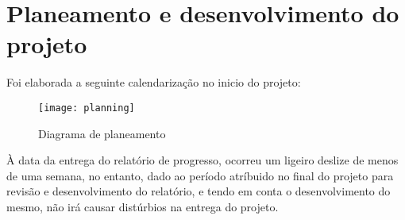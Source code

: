 \section{Planeamento e desenvolvimento do projeto} 
Foi elaborada a seguinte calendarização no inicio do projeto:

\begin{figure}[h]
	\centering
	\texttt{[image: planning]}
	\caption{Diagrama de planeamento}
\end{figure}

À data da entrega do relatório de progresso, ocorreu um ligeiro deslize de menos de uma semana, no entanto, dado ao período atríbuido no final do projeto para revisão e desenvolvimento do relatório, e tendo em conta o desenvolvimento do mesmo, não irá causar distúrbios na entrega do projeto.